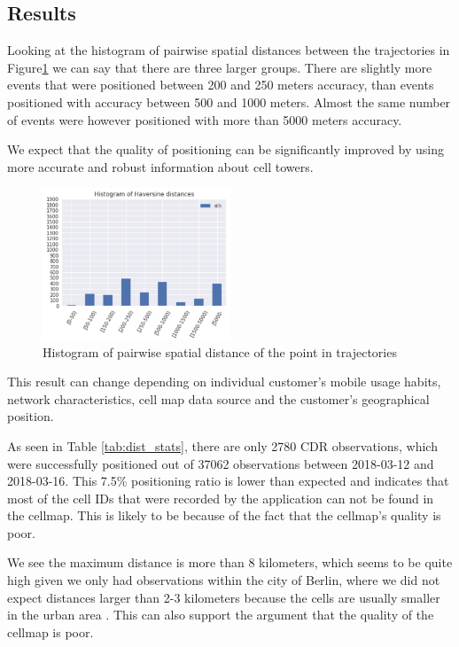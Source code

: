 \subsection{Results}
Looking at the histogram of pairwise spatial distances between the trajectories in Figure\ref{fig:hist} we can say that there are three larger groups. There are slightly more events that were positioned between 200 and 250 meters accuracy, than events positioned with accuracy between 500 and 1000 meters. Almost the same number of events were however positioned with more than 5000 meters accuracy.

We expect that the quality of positioning can be significantly improved by using more accurate and robust information about cell towers.

\begin{figure}[h]
    \centering
    \includegraphics[width=0.5\textwidth]{images/hist.png}
    \caption{Histogram of pairwise spatial distance of the point in trajectories}
    \label{fig:hist}
\end{figure}

This result can change depending on individual customer's mobile usage habits, network characteristics, cell map data source and the customer's geographical position.

As seen in Table \ref{tab:dist_stats}, there are only 2780 CDR observations, which were successfully positioned out of 37062 observations between 2018-03-12 and 2018-03-16. This 7.5\% positioning ratio is lower than expected and indicates that most of the cell IDs that were recorded by the application can not be found in the cellmap. This is likely to be because of the fact that the cellmap's quality is poor.

We see the maximum distance is more than 8 kilometers, which seems to be quite high given we only had observations within the city of Berlin, where we did not expect distances larger than 2-3 kilometers because the cells are usually smaller in the urban area \cite{cell-site}. This can also support the argument that the quality of the cellmap is poor.


